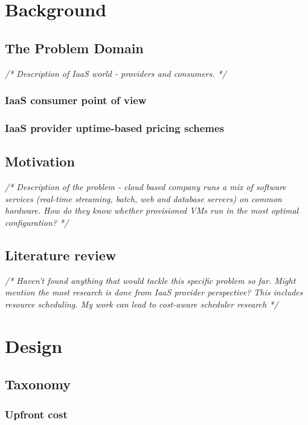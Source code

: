 \documentclass[]{final_report}
\begin{document}
\chapter{Background}

\section{The Problem Domain}
\emph{/* Description of IaaS world - providers and consumers. */}
\subsection{IaaS consumer point of view}
\subsection{IaaS provider uptime-based pricing schemes}

\section{Motivation}
\emph{ /* Description of the problem - cloud based company runs a mix of software services (real-time streaming, batch, web and database servers) on common hardware. How do they know whether provisioned VMs run in the most optimal configuration? */ }

\section{Literature review}
\emph{/* Haven't found anything that would tackle this specific problem so far. Might mention the most research is done from IaaS provider perspective? This includes resource scheduling. My work can lead to cost-aware scheduler research */}




\chapter{Design}

\section{Taxonomy}

\subsection{Upfront cost}
\end{document}
